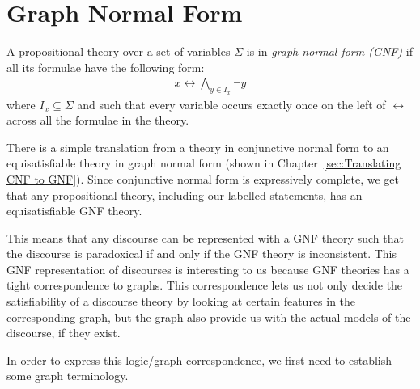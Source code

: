 
\section{Graph Normal Form}
\label{sec:Graph Normal Form}
A propositional theory over a set of variables $\Sigma$ is in \textit{graph normal form (GNF)}\cite{apal-digraph} if all its formulae have the following form:
\begin{align}
  x \leftrightarrow \bigwedge_{y \in I_x} \neg y
\end{align}
where $I_x \subseteq \Sigma$ and such that every variable occurs exactly once on the left of $\leftrightarrow$ across all the formulae in the theory.

There is a simple translation from a theory in conjunctive normal form to an equisatisfiable theory in graph normal form (shown in Chapter~\ref{sec:Translating CNF to GNF}).
Since conjunctive normal form is expressively complete, we get that any propositional theory, including our labelled statements, has an equisatisfiable GNF theory.

This means that any discourse can be represented with a GNF theory such that the discourse is paradoxical if and only if the GNF theory is inconsistent.
This GNF representation of discourses is interesting to us because GNF theories has a tight correspondence to graphs.
This correspondence lets us not only decide the satisfiability of a discourse theory by looking at certain features in the corresponding graph, but the graph also provide us with the actual models of the discourse, if they exist.

In order to express this logic/graph correspondence, we first need to establish some graph terminology.
